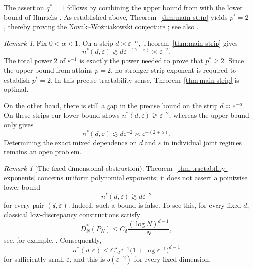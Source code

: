 \documentclass[11pt]{article}
\theoremstyle{plain}
\theoremstyle{remark}
\newtheorem{remark}[theorem]{Remark}
\theoremstyle{definition}
\newcommand{\1}{\mathbf{1}}
\begin{document}
The assertion \(q^\ast=1\) follows by combining the upper bound from
\cite{HNWW01} with the lower bound of Hinrichs \cite{H04}.
As established above, Theorem~\ref{thm:main-strip} yields \(p^\ast=2\),
thereby proving the Novak--Wo\'{z}niakowski conjecture
\cite[p.~63]{NW10}; see also \cite[Problem~3]{H03}.



\begin{remark}\label{rem:strip-optimality}
Fix \(0<\alpha<1\).  On a strip \(d\asymp\varepsilon^{-\alpha}\), Theorem~\ref{thm:main-strip} gives
\[
 n^{\ast}(d,\varepsilon)
 \gtrsim d\varepsilon^{-(2-\alpha)}
 \asymp\varepsilon^{-2}.
\]
The total power \(2\) of \(\varepsilon^{-1}\) is exactly the power needed to prove that $p^\ast \ge 2$. Since the upper bound from \cite{HNWW01} attains \(p=2\), no stronger strip exponent is required to establish \(p^{\ast}=2\).  In this precise tractability sense, Theorem~\ref{thm:main-strip} is optimal.

On the other hand, there is still a gap in the precise bound on the strip $d \asymp \varepsilon^{-\alpha}$. On these strips our lower bound shows $n^\ast(d, \varepsilon) \gtrsim \varepsilon^{-2}$, whereas the upper bound only gives
\begin{equation*}
n^\ast(d,\varepsilon) \lesssim d\varepsilon^{-2} \asymp \varepsilon^{-(2+\alpha)}.
\end{equation*}
Determining the exact mixed dependence on \(d\) and \(\varepsilon\) in individual joint regimes remains an open problem.
\end{remark}

\begin{remark}[The fixed-dimensional obstruction]\label{rem:fixed-d-obstruction}
Theorem~\ref{thm:tractability-exponents} concerns uniform polynomial exponents; it does not assert a pointwise lower bound
\[
 n^{\ast}(d,\varepsilon)\gtrsim d\varepsilon^{-2}
\]
for every pair \((d,\varepsilon)\). Indeed, such a bound is false. To see this, for every fixed \(d\), classical low-discrepancy constructions satisfy
\[
 D_N^{\ast}(P_N)
 \le C_d\frac{(\log N)^{d-1}}N,
\]
see, for example, \cite{DP10}.  Consequently,
\[
 n^{\ast}(d,\varepsilon)
 \le C'_d\varepsilon^{-1}
 \bigl(1+\log\varepsilon^{-1}\bigr)^{d-1}
\]
for sufficiently small \(\varepsilon\), and this is \(o(\varepsilon^{-2})\) for every fixed dimension. 
\end{remark}
\end{document}
